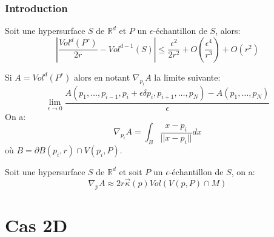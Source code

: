 \documentclass{beamer}
\begin{document}
\begin{frame}[allowframebreaks]
    \frametitle{Introduction}

    \begin{theorem}
        Soit une hypersurface $ S $ de $ \mathbb{R}^d $ et $ P $ un
        $\epsilon$-échantillon de $ S $, alors:
        $$ | \frac{Vol^d(P^r)}{2r} - Vol^{d-1}(S) | \leq \frac{\epsilon^2}{2r^2} +
        O(\frac{\epsilon^4}{r^3}) + O(r^2) $$
    \end{theorem}

    \begin{theorem}
        Si $ A = Vol^d(P^r) $ alors en notant $ \nabla_{p_i} A $ la limite
        suivante:
        $$ \lim\limits_{\epsilon \to 0} \frac{A(p_1, \ldots, p_{i-1}, p_i + \epsilon
            \delta p_i, p_{i+1}, \ldots, p_N) - A(p_1, \ldots, p_N)}{\epsilon} $$
        On a:
        $$ \nabla_{p_i} A = \int_{B} \frac{x - p_i}{||x - p_i||} dx $$
        où $ B = \partial B(p_i, r) \cap V(p_i, P) $.
    \end{theorem}

    \begin{theorem}
        Soit une hypersurface $ S $ de $ \mathbb{R}^d $ et soit $ P $ un
        $\epsilon$-échantillon de $ S $, on a:
        $$ \nabla_p A \approx 2 r \vec{\kappa}(p) Vol(V(p, P) \cap
        M) $$
    \end{theorem}
\end{frame}

\section{Cas 2D}
\end{document}
